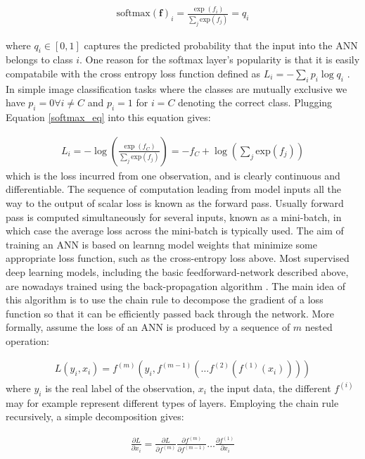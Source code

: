 \documentclass[12pt]{report}
\begin{document}
\begin{align} \label{softmax_eq}
  \text{softmax}(\mathbf{f})_i = \frac{\exp (f_i)}{\sum_j \text{exp}(f_j)}=q_i
\end{align}

where $q_i \in [0,1]$ captures the predicted probability that the input into the ANN belongs to class $i$. One reason for the softmax layer's popularity is that it is easily compatabile with the cross entropy loss function defined as $L_i=-\sum_i p_i \log q_i$ \cite{Shannon1948}. In simple image classification tasks where the classes are mutually exclusive we have $p_i=0 \forall i\ne C$ and $p_i=1$ for $i=C$ denoting the correct class. Plugging Equation \ref{softmax_eq} into this equation gives:

\begin{align} \label{XEloss}
  L_i  = -\log \left(\frac{\exp (f_C)}{\sum_j \text{exp}(f_j)}\right) = -f_C + \log\left(\sum_j \text{exp}(f_j)\right)
\end{align}
which is the loss incurred from one observation, and is clearly continuous and differentiable. The sequence of computation leading from model inputs all the way to the output of scalar loss is known as the forward pass. Usually forward pass is computed simultaneously for several inputs, known as a mini-batch, in which case the average loss across the mini-batch is typically used. 
The aim of training an ANN is based on learnng model weights that minimize some appropriate loss function, such as the cross-entropy loss above. Most supervised deep learning models, including the basic feedforward-network described above, are nowadays trained using the back-propagation algorithm \cite{Linnainmaa1976} \cite{Rumelhart1985}. The main idea of this algorithm is to use the chain rule to decompose the gradient of a loss function so that it can be efficiently passed back through the network. More formally, assume the loss of an ANN is produced by a sequence of $m$ nested operation:

\begin{align} \label{bp_eq1}
  L(y_i, x_i) = f^{(m)}(y_i, f^{(m-1)}(\dots f^{(2)}(f^{(1)}(x_i))))
\end{align}
where $y_i$ is the real label of the observation, $x_i$ the input data, the different $f^{(i)}$ may for example represent different types of layers. Employing the chain rule recursively, a simple decomposition gives:

\begin{align} \label{bp_crule}
  \frac{\partial L}{\partial x_i} = \frac{\partial L}{\partial f^{(m)}}\frac{\partial f^{(m)}}{\partial f^{(m-1)}} \dots \frac{\partial f^{(1)}}{\partial x_i}
\end{align}
\end{document}
